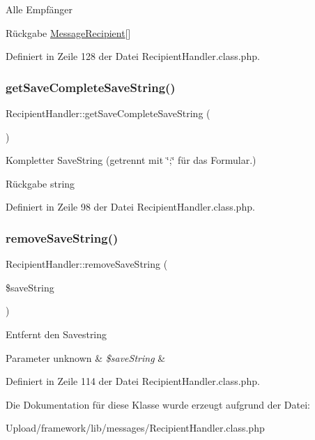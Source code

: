 Alle Empfänger \begin{DoxyReturn}{Rückgabe}
\mbox{\hyperlink{class_message_recipient}{Message\+Recipient}}\mbox{[}\mbox{]} 
\end{DoxyReturn}


Definiert in Zeile 128 der Datei Recipient\+Handler.\+class.\+php.

\mbox{\label{class_recipient_handler_ad4a308d96eb6a1d46fea7dfd2d01b886}} 
\subsubsection{\texorpdfstring{get\+Save\+Complete\+Save\+String()}{getSaveCompleteSaveString()}}
{\footnotesize\ttfamily Recipient\+Handler\+::get\+Save\+Complete\+Save\+String (\begin{DoxyParamCaption}{ }\end{DoxyParamCaption})}

Kompletter Save\+String (getrennt mit \char`\"{};\char`\"{} für das Formular.) \begin{DoxyReturn}{Rückgabe}
string 
\end{DoxyReturn}


Definiert in Zeile 98 der Datei Recipient\+Handler.\+class.\+php.

\mbox{\label{class_recipient_handler_a664b5c58ae2681228991ae107b198062}} 
\subsubsection{\texorpdfstring{remove\+Save\+String()}{removeSaveString()}}
{\footnotesize\ttfamily Recipient\+Handler\+::remove\+Save\+String (\begin{DoxyParamCaption}\item[{}]{\$save\+String }\end{DoxyParamCaption})}

Entfernt den Savestring 
\begin{DoxyParams}[1]{Parameter}
unknown & {\em \$save\+String} & \\
\hline
\end{DoxyParams}


Definiert in Zeile 114 der Datei Recipient\+Handler.\+class.\+php.



Die Dokumentation für diese Klasse wurde erzeugt aufgrund der Datei\+:\begin{DoxyCompactItemize}
\item 
Upload/framework/lib/messages/Recipient\+Handler.\+class.\+php\end{DoxyCompactItemize}
